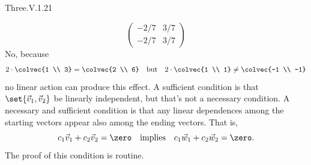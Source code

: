 \begin{ans}{Three.V.1.21}
\begin{exparts}
\begin{equation*}
\begin{pmatrix}
             -2/7  &3/7 \\
             -2/7  &3/7
           \end{pmatrix}
         \end{equation*}
       \partsitem No, because
         \begin{equation*}
           2\cdot\colvec{1 \\ 3}=\colvec{2 \\ 6}
           \quad\text{but}\quad
           2\cdot\colvec{1 \\ 1}\neq\colvec{-1 \\ -1}
         \end{equation*}
         no linear action can produce this effect.
       \partsitem A sufficient condition is that
         \( \set{\vec{v}_1,\vec{v}_2} \) be linearly independent, but
         that's not a necessary condition.
         A necessary and sufficient condition is that any linear dependences
         among the starting vectors appear also among the ending vectors.
         That is,
         \begin{equation*}
           c_1\vec{v}_1+c_2\vec{v}_2=\zero
           \quad\text{implies}\quad
           c_1\vec{w}_1+c_2\vec{w}_2=\zero.
         \end{equation*}
         The proof of this condition is routine.
     \end{exparts}
   
\end{ans}

